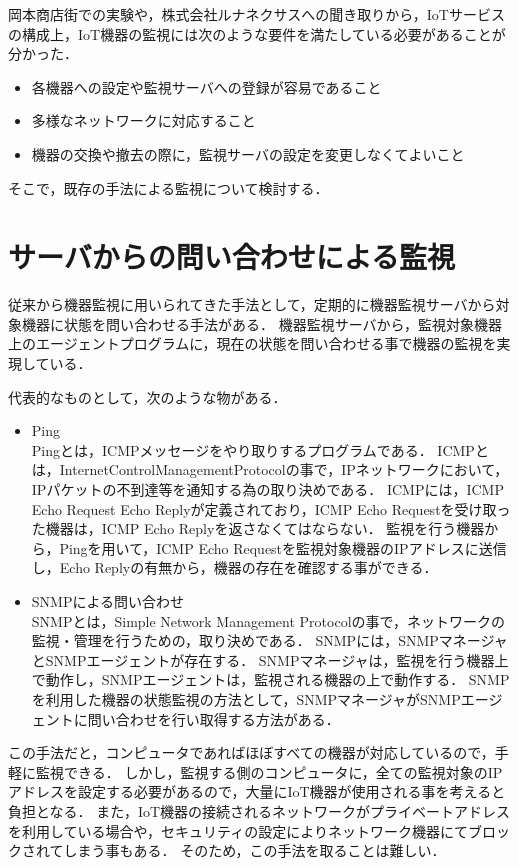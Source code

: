 
岡本商店街での実験や，株式会社ルナネクサスへの聞き取りから，IoTサービスの構成上，IoT機器の監視には次のような要件を満たしている必要があることが分かった．
\begin{itemize}
\item 各機器への設定や監視サーバへの登録が容易であること
\item 多様なネットワークに対応すること
\item 機器の交換や撤去の際に，監視サーバの設定を変更しなくてよいこと
\end{itemize}
そこで，既存の手法による監視について検討する．

\section{サーバからの問い合わせによる監視}
	従来から機器監視に用いられてきた手法として，定期的に機器監視サーバから対象機器に状態を問い合わせる手法がある．
	機器監視サーバから，監視対象機器上のエージェントプログラムに，現在の状態を問い合わせる事で機器の監視を実現している．
	\medskip

	代表的なものとして，次のような物がある．
	\begin{itemize}
		\item Ping\\
			Pingとは，ICMPメッセージをやり取りするプログラムである．
			ICMPとは，InternetControlManagementProtocolの事で，IPネットワークにおいて，IPパケットの不到達等を通知する為の取り決めである．
			ICMPには，ICMP Echo Request Echo Replyが定義されており，ICMP Echo Requestを受け取った機器は，ICMP Echo Replyを返さなくてはならない．
			監視を行う機器から，Pingを用いて，ICMP Echo Requestを監視対象機器のIPアドレスに送信し，Echo Replyの有無から，機器の存在を確認する事ができる．
		\item SNMPによる問い合わせ\\
			SNMPとは，Simple Network Management Protocolの事で，ネットワークの監視・管理を行うための，取り決めである．
			SNMPには，SNMPマネージャとSNMPエージェントが存在する．
			SNMPマネージャは，監視を行う機器上で動作し，SNMPエージェントは，監視される機器の上で動作する．
			SNMPを利用した機器の状態監視の方法として，SNMPマネージャがSNMPエージェントに問い合わせを行い取得する方法がある．
	\end{itemize}
	
	この手法だと，コンピュータであればほぼすべての機器が対応しているので，手軽に監視できる．
	しかし，監視する側のコンピュータに，全ての監視対象のIPアドレスを設定する必要があるので，大量にIoT機器が使用される事を考えると負担となる．
	また，IoT機器の接続されるネットワークがプライベートアドレスを利用している場合や，セキュリティの設定によりネットワーク機器にてブロックされてしまう事もある．
	そのため，この手法を取ることは難しい．

